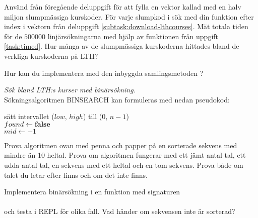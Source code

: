 \Subtask Använd  från föregående deluppgift för att fylla en vektor kallad  med en halv miljon slumpmässiga kurskoder. För varje slumpkod i  sök med din funktion  efter index i vektorn  från deluppgift \ref{subtask:download-lthcourses}. Mät totala tiden för de $500000$ linjärsökningarna med hjälp av funktionen  från uppgift \ref{task:timed}. Hur många av de slumpmässiga kurskoderna hittades bland de verkliga kurskoderna på LTH?



\Subtask\Pen Hur kan du implementera  med den inbyggda samlingsmetoden ?



\Task \emph{Sök bland LTH:s kurser med binärsökning.} \\Sökningsalgoritmen BINSEARCH kan formuleras med nedan pseudokod:

\begin{algorithm}[H]

 sätt intervallet ($low$, $high$) till ($0$, $n - 1$) \\
 $found \leftarrow \bf{false}$ \\
 $mid \leftarrow -1$\\
\end{algorithm}

\Subtask Prova algoritmen ovan med penna och papper på en sorterade sekvens med mindre än 10 heltal. Prova om algoritmen fungerar med ett jämt antal tal, ett udda antal tal, en sekvens med ett heltal och en tom sekvens. Prova både om talet du letar efter finns och om det inte finns.

\Subtask Implementera binärsökning i en funktion med signaturen\\
\\
och testa i REPL för olika fall. Vad händer om sekvensen inte är sorterad?

